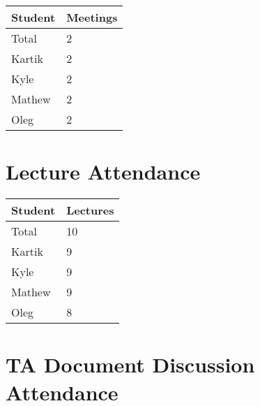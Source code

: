 \documentclass{article}
\begin{document}

\begin{table}[H]
\centering
\begin{tabular}{ll}
\toprule
\textbf{Student} & \textbf{Meetings}\\
\midrule
Total  & 2\\
Kartik & 2\\
Kyle   & 2\\
Mathew & 2\\
Oleg   & 2\\
\bottomrule
\end{tabular}
\end{table}


\section{Lecture Attendance}


\begin{table}[H]
\centering
\begin{tabular}{ll}
\toprule
\textbf{Student} & \textbf{Lectures}\\
\midrule
Total & 10\\
Kartik & 9\\
Kyle   & 9\\
Mathew & 9\\
Oleg   & 8\\
\bottomrule
\end{tabular}
\end{table}


\section{TA Document Discussion Attendance}
\end{document}
